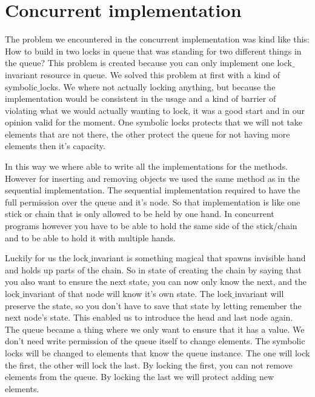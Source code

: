 
\section{Concurrent implementation}
The problem we encountered in the concurrent implementation was kind like this: How to build in two locks in queue that was standing for two different things in the queue? This problem is created because you can only implement one lock$\_$invariant resource in queue. We solved this problem at first with a kind of symbolic$\_$locks. We where not actually locking anything, but because the implementation would be consistent in the usage and a kind of barrier of violating what we would actually wanting to lock, it was a good start and in our opinion valid for the moment. One symbolic locks protects that we will not take elements that are not there, the other protect the queue for not having more elements then it's capacity.

In this way we where able to write all the implementations for the methods. However for inserting and removing objects we used the same method as in the sequential implementation. The sequential implementation required to have the full permission over the queue and it's node. So that implementation is like one stick or chain that is only allowed to be held by one hand. In concurrent programs however you have to be able to hold the same side of the stick/chain and to be able to hold it with multiple hands. 

Luckily for us the lock$\_$invariant is something magical that spawns invisible hand and holds up parts of the chain. So in state of creating the chain by saying that you also want to ensure the next state, you can now only know the next, and the lock$\_$invariant of that node will know it's own state. The lock$\_$invariant will preserve the state, so you don't have to save that state by letting remember the next node's state. This enabled us to introduce the head and last node again. The queue became a thing where we only want to ensure that it has a value. We don't need write permission of the queue itself to change elements. The symbolic locks will be changed to elements that know the queue instance. The one will lock the first, the other will lock the last. By locking the first, you can not remove elements from the queue. By locking the last we will protect adding new elements.

